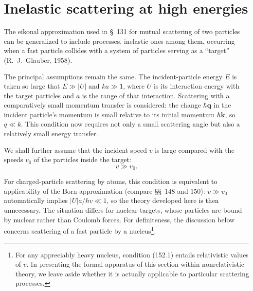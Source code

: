 \section{Inelastic scattering at high energies}

The eikonal approximation used in \S~131 for mutual scattering of two particles can be generalized to include processes, inelastic ones among them, occurring when a fast particle collides with a system of particles serving as a ``target'' (R.~J.~Glauber, 1958).

The principal assumptions remain the same. The incident-particle energy $E$ is taken so large that $E\gg|U|$ and $ka\gg1$, where $U$ is its interaction energy with the target particles and $a$ is the range of that interaction. Scattering with a comparatively small momentum transfer is considered: the change $\hbar\mathbf q$ in the incident particle's momentum is small relative to its initial momentum $\hbar\mathbf k$, so $q\ll k$. This condition now requires not only a small scattering angle but also a relatively small energy transfer.

We shall further assume that the incident speed $v$ is large compared with the speeds $v_0$ of the particles inside the target:
\begin{equation}
 v\gg v_0.
 \tag{152.1}
\end{equation}

For charged-particle scattering by atoms, this condition is equivalent to applicability of the Born approximation (compare \S\S~148 and 150): $v\gg v_0$ automatically implies $|U|a/\hbar v\ll1$, so the theory developed here is then unnecessary. The situation differs for nuclear targets, whose particles are bound by nuclear rather than Coulomb forces. For definiteness, the discussion below concerns scattering of a fast particle by a nucleus\footnote{For any appreciably heavy nucleus, condition (152.1) entails relativistic values of $v$. In presenting the formal apparatus of this section within nonrelativistic theory, we leave aside whether it is actually applicable to particular scattering processes.}.

